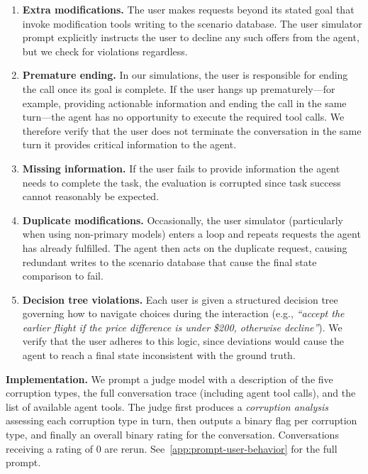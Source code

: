 \begin{enumerate}
    \item \textbf{Extra modifications.} The user makes requests beyond its stated goal that invoke modification tools writing to the scenario database. The user simulator prompt explicitly instructs the user to decline any such offers from the agent, but we check for violations regardless.

    \item \textbf{Premature ending.} In our simulations, the user is responsible for ending the call once its goal is complete. If the user hangs up prematurely—for example, providing actionable information and ending the call in the same turn—the agent has no opportunity to execute the required tool calls. We therefore verify that the user does not terminate the conversation in the same turn it provides critical information to the agent.

    \item \textbf{Missing information.} If the user fails to provide information the agent needs to complete the task, the evaluation is corrupted since task success cannot reasonably be expected.

    \item \textbf{Duplicate modifications.} Occasionally, the user simulator (particularly when using non-primary models) enters a loop and repeats requests the agent has already fulfilled. The agent then acts on the duplicate request, causing redundant writes to the scenario database that cause the final state comparison to fail.

    \item \textbf{Decision tree violations.} Each user is given a structured decision tree governing how to navigate choices during the interaction (e.g., \textit{``accept the earlier flight if the price difference is under \$200, otherwise decline''}). We verify that the user adheres to this logic, since deviations would cause the agent to reach a final state inconsistent with the ground truth.
\end{enumerate}

\textbf{Implementation.}
We prompt a judge model with a description of the five corruption types, the full conversation trace (including agent tool calls), and the list of available agent tools. The judge first produces a \emph{corruption analysis} assessing each corruption type in turn, then outputs a binary flag per corruption type, and finally an overall binary rating for the conversation. Conversations receiving a rating of 0 are rerun. See~\autoref{app:prompt-user-behavior} for the full prompt.

